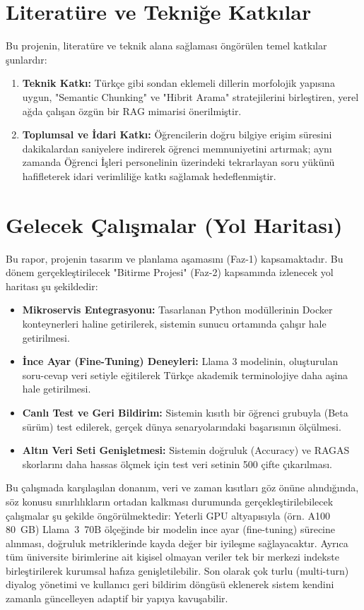 \documentclass[12pt,a4paper]{report}
\begin{document}
\section{Literatüre ve Tekniğe Katkılar}
Bu projenin, literatüre ve teknik alana sağlaması öngörülen temel katkılar şunlardır:
\begin{enumerate}
    \item \textbf{Teknik Katkı:} Türkçe gibi sondan eklemeli dillerin morfolojik yapısına uygun, "Semantic Chunking" ve "Hibrit Arama" stratejilerini birleştiren, yerel ağda çalışan özgün bir RAG mimarisi önerilmiştir.
    \item \textbf{Toplumsal ve İdari Katkı:} Öğrencilerin doğru bilgiye erişim süresini dakikalardan saniyelere indirerek öğrenci memnuniyetini artırmak; aynı zamanda Öğrenci İşleri personelinin üzerindeki tekrarlayan soru yükünü hafifleterek idari verimliliğe katkı sağlamak hedeflenmiştir.
\end{enumerate}

\newpage
\section{Gelecek Çalışmalar (Yol Haritası)}
Bu rapor, projenin tasarım ve planlama aşamasını (Faz-1) kapsamaktadır. Bu dönem gerçekleştirilecek "Bitirme Projesi" (Faz-2) kapsamında izlenecek yol haritası şu şekildedir:
\begin{itemize}
    \item \textbf{Mikroservis Entegrasyonu:} Tasarlanan Python modüllerinin Docker konteynerleri haline getirilerek, sistemin sunucu ortamında çalışır hale getirilmesi.
    \item \textbf{İnce Ayar (Fine-Tuning) Deneyleri:} Llama 3 modelinin, oluşturulan soru-cevap veri setiyle eğitilerek Türkçe akademik terminolojiye daha aşina hale getirilmesi.
    \item \textbf{Canlı Test ve Geri Bildirim:} Sistemin kısıtlı bir öğrenci grubuyla (Beta sürüm) test edilerek, gerçek dünya senaryolarındaki başarısının ölçülmesi.
    \item \textbf{Altın Veri Seti Genişletmesi:} Sistemin doğruluk (Accuracy) ve RAGAS skorlarını daha hassas ölçmek için test veri setinin 500 çifte çıkarılması.
\end{itemize}

Bu çalışmada karşılaşılan donanım, veri ve zaman kısıtları göz önüne alındığında, söz konusu sınırlılıkların ortadan kalkması durumunda gerçekleştirilebilecek çalışmalar şu şekilde öngörülmektedir: Yeterli GPU altyapısıyla (örn. A100 80~GB) Llama~3~70B ölçeğinde bir modelin ince ayar (fine-tuning) sürecine alınması, doğruluk metriklerinde kayda değer bir iyileşme sağlayacaktır. Ayrıca tüm üniversite birimlerine ait kişisel olmayan veriler tek bir merkezi indekste birleştirilerek kurumsal hafıza genişletilebilir. Son olarak çok turlu (multi-turn) diyalog yönetimi ve kullanıcı geri bildirim döngüsü eklenerek sistem kendini zamanla güncelleyen adaptif bir yapıya kavuşabilir.
\end{document}
